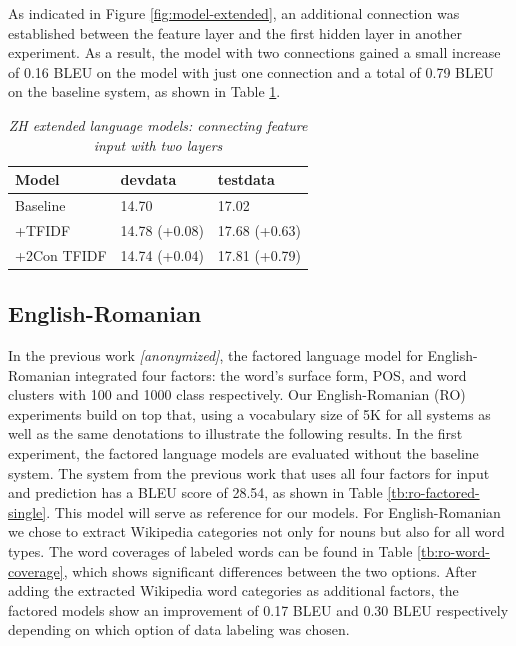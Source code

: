 \documentclass[a4paper]{article}
\newcommand{\anony}[1]{\textit{[anonymized]}}
\begin{document}
As indicated in Figure \ref{fig:model-extended}, an additional connection was established between the feature layer and the first hidden layer in another experiment. As a result, the model with two connections gained a small increase of 0.16 BLEU on the model with just one connection and a total of 0.79 BLEU on the baseline system, as shown in Table \ref{tb:zh-extended-both}.


\begin{table}
\caption{\it ZH extended language models: connecting feature input with two layers}
\vspace{2mm}
\centering
  \begin{tabular}{lll}
  	\hline
  	Model       & devdata       & testdata      \\ \hline\hline
  	Baseline    & 14.70         & 17.02         \\ \hline
  	+TFIDF      & 14.78 (+0.08) & 17.68 (+0.63) \\
  	+2Con TFIDF & 14.74 (+0.04) & 17.81 (+0.79)
  \end{tabular}
  \label{tb:zh-extended-both}
\end{table}


\subsection{English-Romanian}
In the previous work \anony{\cite{niehuesusing}}, the factored language model for English-Romanian integrated four factors: the word's surface form, POS, and word clusters with 100 and 1000 class respectively. Our English-Romanian (RO) experiments build on top that, using a vocabulary size of 5K for all systems as well as the same denotations to illustrate the following results. In the first experiment, the factored language models are evaluated without the baseline system. The system from the previous work that uses all four factors for input and prediction has a BLEU score of 28.54, as shown in Table \ref{tb:ro-factored-single}. This model will serve as reference for our models. For English-Romanian we chose to extract Wikipedia categories not only for nouns but also for all word types. The word coverages of labeled words can be found in Table \ref{tb:ro-word-coverage}, which shows significant differences between the two options.
After adding the extracted Wikipedia word categories as additional factors, the factored models show an improvement of 0.17 BLEU and 0.30 BLEU respectively depending on which option of data labeling was chosen.
\end{document}
